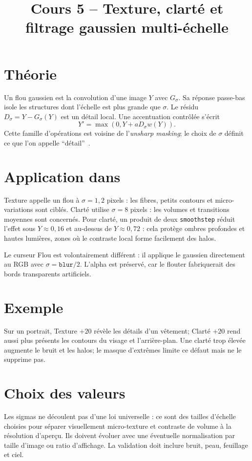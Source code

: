 
\title{Cours 5 -- Texture, clarté et filtrage gaussien multi-échelle}


\section{Théorie}
Un flou gaussien est la convolution d'une image $Y$ avec $G_\sigma$. Sa réponse passe-bas isole les structures dont l'échelle est plus grande que $\sigma$. Le résidu $D_\sigma=Y-G_\sigma(Y)$ est un détail local. Une accentuation contrôlée s'écrit
\begin{equation}
Y'=\max(0,Y+aD_\sigma w(Y)).
\end{equation}
Cette famille d'opérations est voisine de l'\emph{unsharp masking}; le choix de $\sigma$ définit ce que l'on appelle ``détail''~\cite{gonzalezWoods,opencvGaussian}.

\section{Application dans \IPR{}}
Texture appelle un flou à $\sigma=1{,}2$ pixels : les fibres, petits contours et micro-variations sont ciblés. Clarté utilise $\sigma=8$ pixels : les volumes et transitions moyennes sont concernés. Pour clarté, un produit de deux \texttt{smoothstep} réduit l'effet sous $Y\approx0{,}16$ et au-dessus de $Y\approx0{,}72$ : cela protège ombres profondes et hautes lumières, zones où le contraste local forme facilement des halos.

Le curseur Flou est volontairement différent : il applique le gaussien directement au RGB avec $\sigma=\texttt{blur}/2$. L'alpha est préservé, car le flouter fabriquerait des bords transparents artificiels.

\section{Exemple}
Sur un portrait, Texture $+20$ révèle les détails d'un vêtement; Clarté $+20$ rend aussi plus présents les contours du visage et l'arrière-plan. Une clarté trop élevée augmente le bruit et les halos; le masque d'extrêmes limite ce défaut mais ne le supprime pas.

\section{Choix des valeurs}
Les sigmas ne découlent pas d'une loi universelle : ce sont des tailles d'échelle choisies pour séparer visuellement micro-texture et contraste de volume à la résolution d'aperçu. Ils doivent évoluer avec une éventuelle normalisation par taille d'image ou ratio d'affichage. La validation doit inclure bruit, peau, feuillage et ciel.



